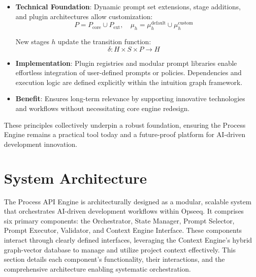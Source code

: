 \documentclass[11pt,a4paper]{article}
\begin{document}
\begin{itemize}
    \item \textbf{Technical Foundation}:
    Dynamic prompt set extensions, stage additions, and plugin architectures allow customization:
    \[
    P = P_{\text{core}} \cup P_{\text{ext}}, \quad \mu_h = \mu_h^{\text{default}} \cup \mu_h^{\text{custom}}
    \]

    New stages \( h \) update the transition function:
    \[
    \delta: H \times S \times P \rightarrow H
    \]

    \item \textbf{Implementation}:
    Plugin registries and modular prompt libraries enable effortless integration of user-defined prompts or policies. Dependencies and execution logic are defined explicitly within the intuition graph framework.

    \item \textbf{Benefit}:
    Ensures long-term relevance by supporting innovative technologies and workflows without necessitating core engine redesign.
\end{itemize}

These principles collectively underpin a robust foundation, ensuring the Process Engine remains a practical tool today and a future-proof platform for AI-driven development innovation.

\section{System Architecture}
\label{sec:architecture}

The Process API Engine is architecturally designed as a modular, scalable system that orchestrates AI-driven development workflows within Opseeq. It comprises six primary components: the Orchestrator, State Manager, Prompt Selector, Prompt Executor, Validator, and Context Engine Interface. These components interact through clearly defined interfaces, leveraging the Context Engine’s hybrid graph-vector database to manage and utilize project context effectively. This section details each component’s functionality, their interactions, and the comprehensive architecture enabling systematic orchestration.

\end{document}
